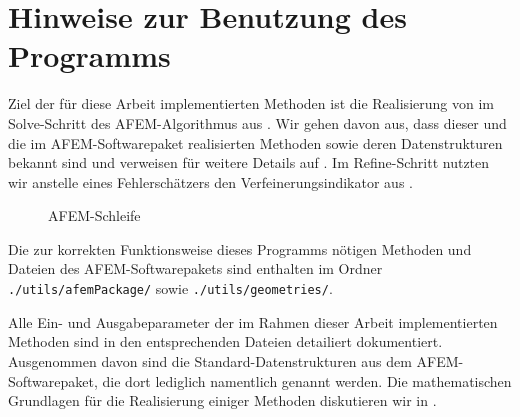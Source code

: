 \section{Hinweise zur Benutzung des Programms}
Ziel der für diese Arbeit implementierten Methoden ist die Realisierung von
 im Solve-Schritt des AFEM-Algorithmus aus
. 
Wir gehen davon aus, dass dieser und die im
AFEM-Softwarepaket realisierten Methoden sowie deren Datenstrukturen bekannt
sind und verweisen für weitere Details auf \cite{CGKNRR10}. 
Im Refine-Schritt nutzten wir anstelle eines Fehlerschätzers den
Verfeinerungsindikator aus .

\begin{figure}[h]
  \centering
  
  \caption{AFEM-Schleife}
  \label{fig:afemLoop}
\end{figure}

Die zur korrekten Funktionsweise dieses Programms nötigen Methoden und
Dateien des AFEM-Softwarepakets sind enthalten im Ordner
\texttt{./utils/afemPackage/} sowie \texttt{./utils/geometries/}.

Alle Ein- und Ausgabeparameter der im Rahmen dieser Arbeit implementierten
Methoden sind in den entsprechenden Dateien detailiert dokumentiert. 
Ausgenommen davon sind die Standard-Datenstrukturen aus dem AFEM-Softwarepaket,
die dort lediglich namentlich genannt werden.
Die mathematischen Grundlagen für die Realisierung einiger Methoden diskutieren
wir in .

